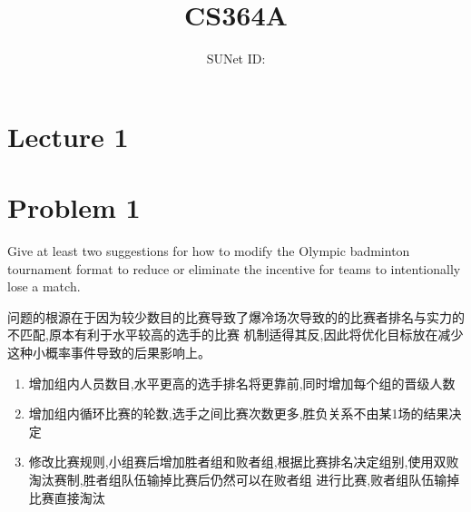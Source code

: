 \documentclass{article}
\title{CS364A \exerciseset}
\author{\studentname \qquad SUNet ID: \suid}
\begin{document}
\maketitle

\section*{Lecture 1}
\section*{Problem 1}
Give at least two suggestions for how to modify the Olympic badminton tournament format to reduce or
eliminate the incentive for teams to intentionally lose a match.

问题的根源在于因为较少数目的比赛导致了爆冷场次导致的的比赛者排名与实力的不匹配,原本有利于水平较高的选手的比赛
机制适得其反,因此将优化目标放在减少这种小概率事件导致的后果影响上。
\begin{enumerate}
\item %
增加组内人员数目,水平更高的选手排名将更靠前,同时增加每个组的晋级人数

\item %
增加组内循环比赛的轮数,选手之间比赛次数更多,胜负关系不由某1场的结果决定

\item %
修改比赛规则,小组赛后增加胜者组和败者组,根据比赛排名决定组别,使用双败淘汰赛制,胜者组队伍输掉比赛后仍然可以在败者组
进行比赛,败者组队伍输掉比赛直接淘汰

\end{enumerate}
\end{document}
